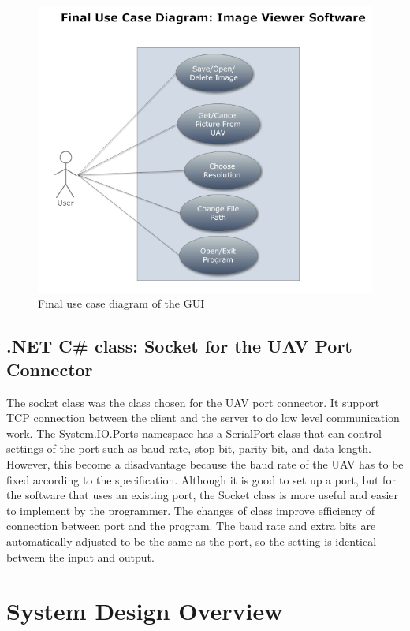 \begin{figure}[!hbtp]
\begin{center}
\includegraphics[scale=0.7]{figures/FinaluserCase.PNG} 
\end{center}
\caption{Final use case diagram of the GUI\label{GUI_finalUseCase}}
\end{figure}

\subsection{.NET C\# class: Socket for the UAV Port Connector}
The socket class was the class chosen for the UAV port connector. It support TCP connection between the client and the server to do low level communication work\cite{xiaX}. The System.IO.Ports namespace has a SerialPort class that can control settings of the port such as baud rate, stop bit, parity bit, and data length. However, this become a disadvantage because the baud rate of the UAV has to be fixed according to the specification. Although it is good to set up a port, but for the software that uses an existing port, the Socket class is more useful and easier to implement by the programmer. The changes of class improve efficiency of connection between port and the program. The baud rate and extra bits are automatically adjusted to be the same as the port, so the setting is identical between the input and output. 





\section{System Design Overview}

